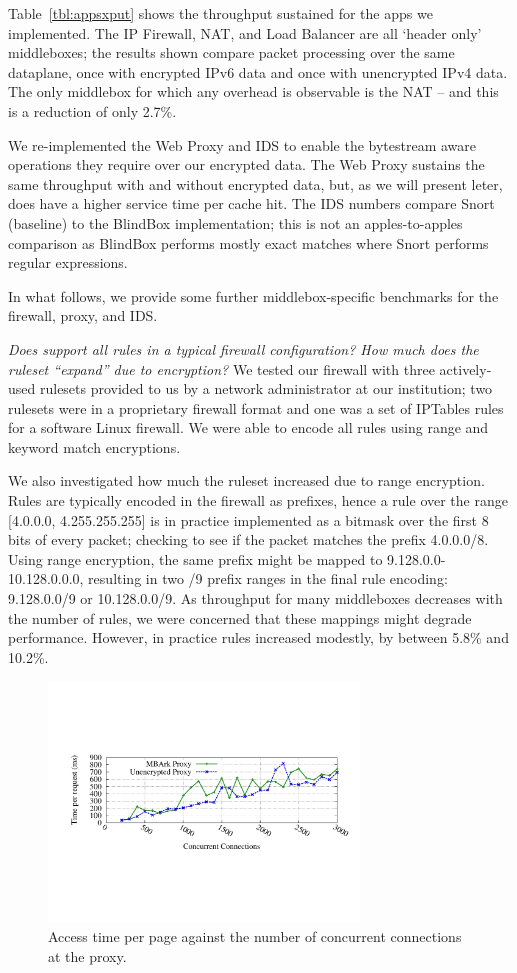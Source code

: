 Table~\ref{tbl:appsxput} shows the throughput sustained for the apps we implemented.
The IP Firewall, NAT, and Load Balancer are all `header only' middleboxes; the results shown compare packet processing over the same dataplane, once with encrypted IPv6 data and once with unencrypted IPv4 data.
The only middlebox for which any overhead is observable is the NAT -- and this is a reduction of only 2.7\%.

We re-implemented the Web Proxy and IDS to enable the bytestream aware operations they require over our encrypted data. The Web Proxy sustains the same throughput with and without encrypted data, but, as we will present leter, does have a higher service time per cache hit.
The IDS numbers compare Snort (baseline) to the BlindBox implementation; this is not an apples-to-apples comparison as BlindBox performs mostly exact matches where Snort performs regular expressions.

In what follows, we provide some further middlebox-specific benchmarks for the firewall, proxy, and IDS.

{\it Does \sys support all rules in a typical firewall configuration? How much does the ruleset ``expand'' due to encryption?}
We tested our firewall with three actively-used rulesets provided to us by a network administrator at our institution; two rulesets were in a proprietary firewall format and one was a set of IPTables rules for a software Linux firewall.
We were able to encode all rules using range and keyword match encryptions.

We also investigated how much the ruleset increased due to range encryption. Rules are typically encoded in the firewall as prefixes, hence a rule over the range [4.0.0.0, 4.255.255.255] is in practice implemented as a bitmask over the first 8 bits of every packet; checking to see if the packet matches the prefix 4.0.0.0/8.
Using range encryption, the same prefix might be mapped to 9.128.0.0-10.128.0.0.0, resulting in two /9 prefix ranges in the final rule encoding: 9.128.0.0/9 or 10.128.0.0/9.
As throughput for many middleboxes decreases with the number of rules, we were concerned that these mappings might degrade performance. However, in practice rules increased modestly, by between 5.8\% and 10.2\%.

\begin{figure}[t]
\centering
\includegraphics[width=3.25in]{fig/proxytime}
\caption{\label{fig:proxygraph} Access time per page against the number of concurrent connections at the proxy.}
\end{figure}

